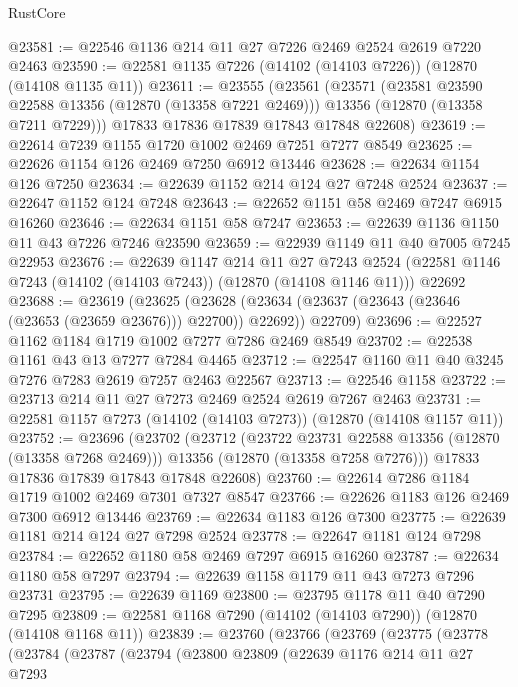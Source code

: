 \begin{lexlean}{RustCore}
\begin{coremodule}
@23581 := @22546 @1136 @214 @11 @27 @7226 @2469 @2524 @2619 @7220 @2463
@23590 := @22581 @1135 @7226 (@14102 (@14103 @7226)) (@12870 (@14108 @1135 @11))
@23611 := @23555
    (@23561
      (@23571
        (@23581 @23590 @22588 @13356 (@12870 (@13358 @7221 @2469)))
        @13356
        (@12870 (@13358 @7211 @7229)))
      @17833
      @17836
      @17839
      @17843
      @17848
      @22608)
@23619 := @22614 @7239 @1155 @1720 @1002 @2469 @7251 @7277 @8549
@23625 := @22626 @1154 @126 @2469 @7250 @6912 @13446
@23628 := @22634 @1154 @126 @7250
@23634 := @22639 @1152 @214 @124 @27 @7248 @2524
@23637 := @22647 @1152 @124 @7248
@23643 := @22652 @1151 @58 @2469 @7247 @6915 @16260
@23646 := @22634 @1151 @58 @7247
@23653 := @22639 @1136 @1150 @11 @43 @7226 @7246 @23590
@23659 := @22939 @1149 @11 @40 @7005 @7245 @22953
@23676 := @22639
    @1147
    @214
    @11
    @27
    @7243
    @2524
    (@22581 @1146 @7243 (@14102 (@14103 @7243)) (@12870 (@14108 @1146 @11)))
    @22692
@23688 := @23619
    (@23625
      (@23628 (@23634 (@23637 (@23643 (@23646 (@23653 (@23659 @23676))) @22700)) @22692))
      @22709)
@23696 := @22527 @1162 @1184 @1719 @1002 @7277 @7286 @2469 @8549
@23702 := @22538 @1161 @43 @13 @7277 @7284 @4465
@23712 := @22547 @1160 @11 @40 @3245 @7276 @7283 @2619 @7257 @2463 @22567
@23713 := @22546 @1158
@23722 := @23713 @214 @11 @27 @7273 @2469 @2524 @2619 @7267 @2463
@23731 := @22581 @1157 @7273 (@14102 (@14103 @7273)) (@12870 (@14108 @1157 @11))
@23752 := @23696
    (@23702
      (@23712
        (@23722 @23731 @22588 @13356 (@12870 (@13358 @7268 @2469)))
        @13356
        (@12870 (@13358 @7258 @7276)))
      @17833
      @17836
      @17839
      @17843
      @17848
      @22608)
@23760 := @22614 @7286 @1184 @1719 @1002 @2469 @7301 @7327 @8547
@23766 := @22626 @1183 @126 @2469 @7300 @6912 @13446
@23769 := @22634 @1183 @126 @7300
@23775 := @22639 @1181 @214 @124 @27 @7298 @2524
@23778 := @22647 @1181 @124 @7298
@23784 := @22652 @1180 @58 @2469 @7297 @6915 @16260
@23787 := @22634 @1180 @58 @7297
@23794 := @22639 @1158 @1179 @11 @43 @7273 @7296 @23731
@23795 := @22639 @1169
@23800 := @23795 @1178 @11 @40 @7290 @7295
@23809 := @22581 @1168 @7290 (@14102 (@14103 @7290)) (@12870 (@14108 @1168 @11))
@23839 := @23760
    (@23766
      (@23769
        (@23775
          (@23778
            (@23784
              (@23787
                (@23794
                  (@23800
                    @23809
                    (@22639
                      @1176
                      @214
                      @11
                      @27
                      @7293

\end{coremodule}
\end{lexlean}
